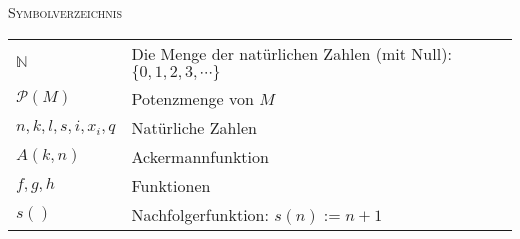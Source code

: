 \documentclass[a4paper]{amsart}
\theoremstyle{definition}
\newcommand{\N}{\ensuremath{\mathbb{ N }}}
\newcommand{\PP}{\ensuremath{\mathcal{ P }}}
\begin{document}
\begin{large}
    \centerline{\textsc{Symbolverzeichnis}}
\end{large}
\bigskip

\renewcommand*{\arraystretch}{1}

\begin{tabular}{ll}
    $\N$                    & Die Menge der natürlichen Zahlen (mit Null): $\{ 0, 1, 2, 3, \cdots \}$\\
    $\PP(M)$                & Potenzmenge von $M$\\
    $n, k, l, s, i, x_i, q$ & Natürliche Zahlen\\
    $A( k, n )$             & Ackermannfunktion\\
    $f, g, h$               & Funktionen\\
    $s()$                   & Nachfolgerfunktion: $s(n) := n+1$

\end{tabular}
\end{document}
